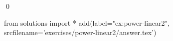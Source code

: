 
\begin{ex} 
  \label{ex:power-linear2}
  
  \qed
\end{ex} 
\begin{python0}
from solutions import *
add(label="ex:power-linear2",
    srcfilename='exercises/power-linear2/answer.tex') 
\end{python0}
